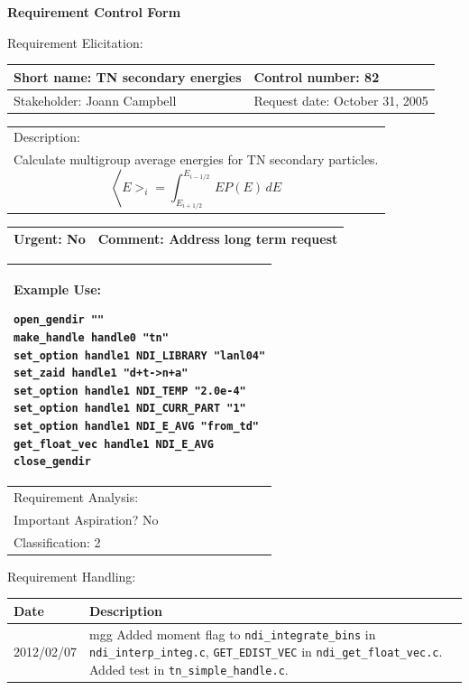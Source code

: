 \begin{center}\Large\bf
Requirement Control Form
\end{center}
\vspace{24pt}

Requirement Elicitation:

\begin{tabular}{|p{211pt}|p{211pt}|} \hline
Short name: TN secondary energies & Control number: 82\\ \hline
Stakeholder: Joann Campbell & Request date: October 31, 2005\\
\end{tabular}
\begin{tabular}{|p{433pt}|} \hline
Description: \\ 
Calculate multigroup average energies for TN secondary particles.
\begin{displaymath}
\left<E>_i = \int_{E_{i+1/2}}^{E_{i-1/2}}\, E P(E)\,dE
\end{displaymath}\\
\hline
\end{tabular} 
\begin{tabular}{|p{211pt}|p{211pt}|} \hline
Urgent: No & Comment: Address long term request \\ \hline
\end{tabular}

\vspace{12pt} 
\begin{tabular}{|p{433pt}|} \hline
Example Use: 
\begin{verbatim}
open_gendir ""
make_handle handle0 "tn"
set_option handle1 NDI_LIBRARY "lanl04"
set_zaid handle1 "d+t->n+a"
set_option handle1 NDI_TEMP "2.0e-4"
set_option handle1 NDI_CURR_PART "1"
set_option handle1 NDI_E_AVG "from_td"
get_float_vec handle1 NDI_E_AVG
close_gendir
\end{verbatim}
\\ \hline

\vspace{24pt}

Requirement Analysis:

\begin{tabular}{|p{433pt}|} \hline
Important user? Yes \\ \hline
Important Aspiration? No \\ \hline
Classification: 2 \\ \hline
\end{tabular}
\vspace{24pt}

Requirement Handling:

\begin{tabular}{|p{72pt}|p{351pt}|} \hline
Date & Description \\ \hline 

2012/02/07 & mgg Added moment flag to \texttt{ndi\_integrate\_bins} in
\texttt{ndi\_interp\_integ.c}, \texttt{GET\_EDIST\_VEC} in
\texttt{ndi\_get\_float\_vec.c}.  Added test in
\texttt{tn\_simple\_handle.c}.
\end{tabular}
